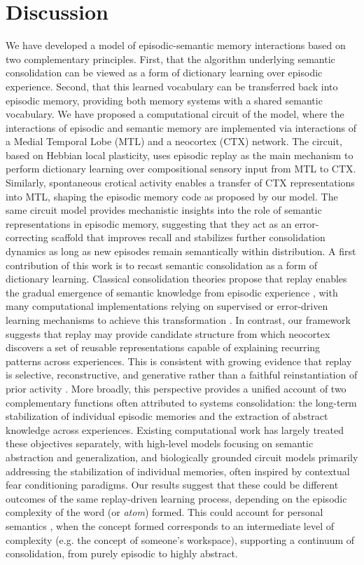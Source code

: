 \documentclass{article}
\begin{document}
\section*{Discussion}
We have developed a model of episodic-semantic memory interactions based on two complementary principles. First, that the algorithm underlying semantic consolidation can be viewed as a form of dictionary learning over episodic experience. Second, that this learned vocabulary can be transferred back into episodic memory, providing both memory systems with a shared semantic vocabulary. We have proposed a computational circuit of the model, where the interactions of episodic and semantic memory are implemented via interactions of a Medial Temporal Lobe (MTL) and a neocortex (CTX) network. The circuit, based on Hebbian local plasticity, uses episodic replay as the main mechanism to perform dictionary learning over compositional sensory input from MTL to CTX. Similarly, spontaneous crotical activity enables a transfer of CTX representations into MTL, shaping the episodic memory code as proposed by our model. The same circuit model provides mechanistic insights into the role of semantic representations in episodic memory, suggesting that they act as an error-correcting scaffold that improves recall and stabilizes further consolidation dynamics as long as new episodes remain semantically within distribution.
\newline\newline
A first contribution of this work is to recast semantic consolidation as a form of dictionary learning. Classical consolidation theories propose that replay enables the gradual emergence of semantic knowledge from episodic experience , with many computational implementations relying on supervised or error-driven learning mechanisms to achieve this transformation . In contrast, our framework suggests that replay may provide candidate structure from which neocortex discovers a set of reusable representations capable of explaining recurring patterns across experiences. This is consistent with growing evidence that replay is selective, reconstructive, and generative rather than a faithful reinstantiation of prior activity . More broadly, this perspective provides a unified account of two complementary functions often attributed to systems consolidation: the long-term stabilization of individual episodic memories and the extraction of abstract knowledge across experiences. Existing computational work has largely treated these objectives separately, with high-level models focusing on semantic abstraction and generalization, and biologically grounded circuit models primarily addressing the stabilization of individual memories, often inspired by contextual fear conditioning paradigms. Our results suggest that these could be different outcomes of the same replay-driven learning process, depending on the episodic complexity of the word (or \textit{atom}) formed. This could account for personal semantics , when the concept formed corresponds to an intermediate level of complexity (e.g. the concept of someone's workspace), supporting a continuum of consolidation, from purely episodic to highly abstract.
\end{document}

